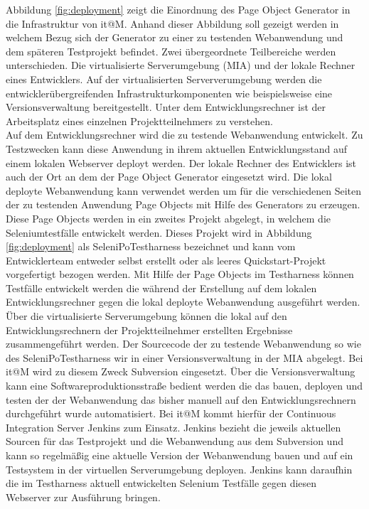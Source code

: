 Abbildung \ref{fig:deployment} zeigt die Einordnung des Page Object Generator in die Infrastruktur von it@M. Anhand dieser Abbildung soll gezeigt werden in welchem Bezug sich der Generator zu einer zu testenden Webanwendung und dem späteren Testprojekt befindet.
Zwei übergeordnete Teilbereiche werden unterschieden. Die virtualisierte Serverumgebung (MIA) und der lokale Rechner eines Entwicklers. Auf der virtualisierten Serververumgebung werden die entwicklerübergreifenden Infrastrukturkomponenten wie beispielsweise eine Versionsverwaltung bereitgestellt. Unter dem Entwicklungsrechner ist der Arbeitsplatz eines einzelnen Projektteilnehmers zu verstehen.\\
Auf dem Entwicklungsrechner wird die zu testende Webanwendung entwickelt. Zu Testzwecken kann diese Anwendung in ihrem aktuellen Entwicklungsstand auf einem lokalen Webserver deployt werden.
Der lokale Rechner des Entwicklers ist auch der Ort an dem der Page Object Generator eingesetzt wird. Die lokal deployte Webanwendung kann verwendet werden um für die verschiedenen Seiten der zu testenden Anwendung Page Objects mit Hilfe des Generators zu erzeugen. Diese Page Objects werden in ein zweites Projekt abgelegt, in welchem die Seleniumtestfälle entwickelt werden. Dieses Projekt wird in Abbildung \ref{fig:deployment} als SeleniPoTestharness bezeichnet und kann vom Entwicklerteam entweder selbst erstellt oder als leeres Quickstart-Projekt vorgefertigt bezogen werden. Mit Hilfe der Page Objects im Testharness können Testfälle entwickelt werden die während der Erstellung auf dem lokalen Entwicklungsrechner gegen die lokal deployte Webanwendung ausgeführt werden.
Über die virtualisierte Serverumgebung können die lokal auf den Entwicklungsrechnern der Projektteilnehmer erstellten Ergebnisse zusammengeführt werden. 
Der Sourcecode der zu testende Webanwendung so wie des SeleniPoTestharness wir in einer Versionsverwaltung in der MIA abgelegt. Bei it@M wird zu diesem Zweck Subversion eingesetzt. Über die Versionsverwaltung kann eine Softwareproduktionsstraße bedient werden die das bauen, deployen und testen der der Webanwendung das bisher manuell auf den Entwicklungsrechnern durchgeführt wurde automatisiert. Bei it@M kommt hierfür der Continuous Integration Server Jenkins zum Einsatz. Jenkins bezieht die jeweils aktuellen Sourcen für das Testprojekt und die Webanwendung aus dem Subversion und kann so regelmäßig eine aktuelle Version der Webanwendung bauen und auf ein Testsystem in der virtuellen Serverumgebung deployen. Jenkins kann daraufhin die im Testharness aktuell entwickelten Selenium Testfälle gegen diesen Webserver zur Ausführung bringen.



